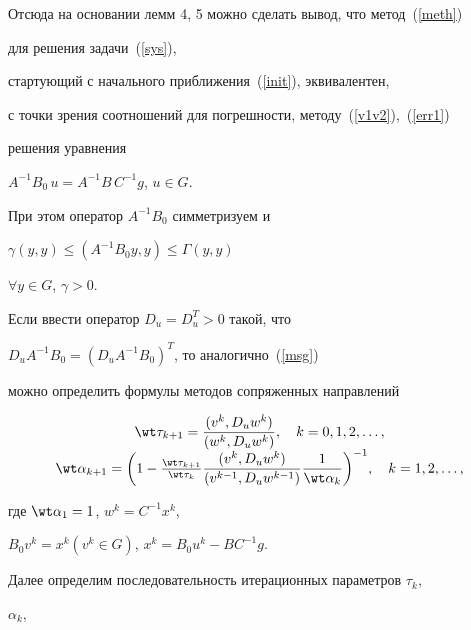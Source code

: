 Отсюда на основании лемм 4, 5 можно сделать вывод, что метод~(\ref{meth})


для решения задачи~(\ref{sys}),


стартующий с начального приближения~(\ref{init}), эквивалентен,


с точки зрения соотношений для погрешности, методу~(\ref{v1v2}),~(\ref{err1})


решения уравнения


$A^{-1}B_0\,u = A^{-1}B\,C^{-1} g$, $u \in G$.


При этом оператор $A^{-1}B_0$ симметризуем и


$\gamma (y,y) \leq (A^{-1}B_0y,y) \leq \Gamma (y,y)$


$\forall y \in G$, $\gamma >0$.


Если ввести оператор $D_u = D_u^T > 0$ такой, что


$D_uA^{-1}B_0 = (D_uA^{-1}B_0)^T$, то аналогично~(\ref{msg})


можно определить формулы методов сопряженных направлений


\begin{equation}


\label{msgu}


\begin{array}{c}


\displaystyle\wt \tau_{k+1} = \frac{(v^k,D_u w^k)}{(w^k,D_u w^k)},


\quad k = 0, 1, 2, \dotsc, \\


\wt \alpha_{k+1} = \bigg(1 - \frac{\wt \tau_{k+1}}{\wt \tau_{k}}


\displaystyle\frac{(v^k,D_u w^k)}{(v^{k-1},D_u w^{k-1})}


\displaystyle\frac1{\wt \alpha_{k}} \bigg)^{-1},


\quad


k = 1, 2, \dotsc,


\end{array}


\end{equation}


где $ \wt \alpha_{1} = 1$, $w^k = C^{-1} x^k$,


$B_0 v^k = x^k (v^k \in G)$, $x^k = B_0 u^k - BC^{-1}g$.





Далее определим последовательность итерационных параметров $\tau_k$,


$\alpha_k$,


